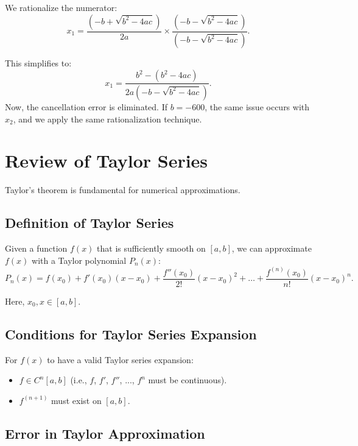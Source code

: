 We rationalize the numerator:
\begin{equation*}
    x_1 = \frac{(-b + \sqrt{b^2 - 4ac})}{2a} \times 
          \frac{(-b - \sqrt{b^2 - 4ac})}{(-b - \sqrt{b^2 - 4ac})}.
\end{equation*}

This simplifies to:
\begin{equation*}
    x_1 = \frac{b^2 - (b^2 - 4ac)}{2a(-b - \sqrt{b^2 - 4ac})}.
\end{equation*}
Now, the cancellation error is eliminated. If $b = -600$, the same issue 
occurs with $x_2$, and we apply the same rationalization technique.

\section{Review of Taylor Series}

Taylor’s theorem is fundamental for numerical approximations.

\subsection{Definition of Taylor Series}

Given a function $f(x)$ that is sufficiently smooth on $[a, b]$, we can 
approximate $f(x)$ with a Taylor polynomial $P_n(x)$:
\begin{equation*}
    P_n(x) = f(x_0) + f'(x_0)(x - x_0) + \frac{f''(x_0)}{2!} (x - x_0)^2 + 
             \dots + \frac{f^{(n)}(x_0)}{n!} (x - x_0)^n.
\end{equation*}

Here, $x_0, x \in [a, b]$.

\subsection{Conditions for Taylor Series Expansion}

For $f(x)$ to have a valid Taylor series expansion:
\begin{itemize}
    \item $f \in C^n[a, b]$ (i.e., $f$, $f'$, $f''$, ..., $f^n$ must be continuous).
    \item $f^{(n+1)}$ must exist on $[a, b]$.
\end{itemize}

\subsection{Error in Taylor Approximation}

